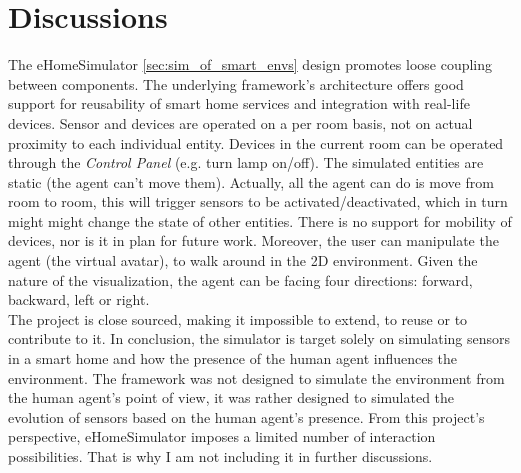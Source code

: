 \section{Discussions}\label{sec:discussions}



The eHomeSimulator \ref{sec:sim_of_smart_envs} design promotes loose coupling between components. The underlying framework's architecture offers good support for reusability of smart home services and integration with real-life devices. Sensor and devices are operated on a per room basis, not on actual proximity to each individual entity. Devices in the current room can be operated through the \emph{Control Panel} (e.g. turn lamp on/off). The simulated entities are static (the agent can't move them). Actually, all the agent can do is move from room to room, this will trigger sensors to be activated/deactivated, which in turn might might change the state of other entities. There is no support for mobility of devices, nor is it in plan for future work. Moreover, the user can manipulate the agent (the virtual avatar), to walk around in the 2D environment. Given the nature of the visualization, the agent can be facing four directions: forward, backward, left or right.\\

The project is close sourced, making it impossible to extend, to reuse or to contribute to it. In conclusion, the simulator is target solely on simulating sensors in a smart home and how the presence of the human agent influences the environment. The framework was not designed to simulate the environment from the human agent's point of view, it was rather designed to simulated the evolution of sensors based on the human agent's presence. From this project's perspective, eHomeSimulator imposes a limited number of interaction possibilities. That is why I am not including it in further discussions.\\

